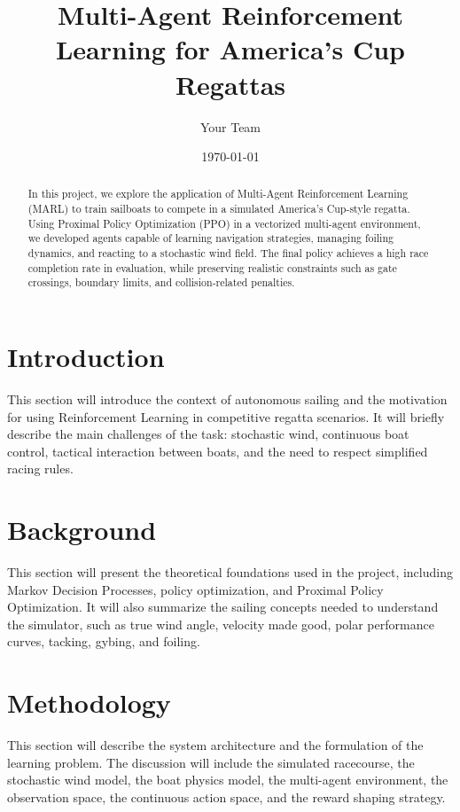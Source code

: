 \documentclass{article}
\title{Multi-Agent Reinforcement Learning for America's Cup Regattas}
\author{Your Team}
\date{\today}
\begin{document}
\maketitle

\begin{abstract}
In this project, we explore the application of Multi-Agent Reinforcement Learning (MARL)
to train sailboats to compete in a simulated America's Cup-style regatta. Using Proximal
Policy Optimization (PPO) in a vectorized multi-agent environment, we developed agents
capable of learning navigation strategies, managing foiling dynamics, and reacting to a
stochastic wind field. The final policy achieves a high race completion rate in evaluation,
while preserving realistic constraints such as gate crossings, boundary limits, and
collision-related penalties.
\end{abstract}

\section{Introduction}

This section will introduce the context of autonomous sailing and the motivation for using
Reinforcement Learning in competitive regatta scenarios. It will briefly describe the main
challenges of the task: stochastic wind, continuous boat control, tactical interaction between
boats, and the need to respect simplified racing rules.

\section{Background}

This section will present the theoretical foundations used in the project, including Markov
Decision Processes, policy optimization, and Proximal Policy Optimization. It will also
summarize the sailing concepts needed to understand the simulator, such as true wind angle,
velocity made good, polar performance curves, tacking, gybing, and foiling.

\section{Methodology}

This section will describe the system architecture and the formulation of the learning problem.
The discussion will include the simulated racecourse, the stochastic wind model, the boat
physics model, the multi-agent environment, the observation space, the continuous action
space, and the reward shaping strategy.
\end{document}
